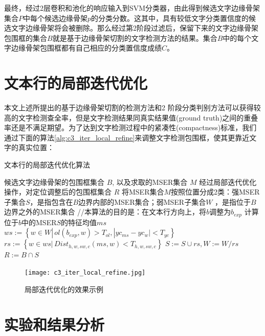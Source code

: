         最终，经过2层卷积和池化的响应输入到SVM分类器，由此得到候选文字边缘骨架集合$P$中每个候选边缘骨架$p$的分类分数。这其中，具有较低文字分类置信度的候选文字边缘骨架将会被删除。那么经过第2阶段过滤后，保留下来的文字边缘骨架包围框的集合$B$就是基于边缘骨架切割的文字检测方法的结果。集合$B$中的每个文字边缘骨架包围框都有自己相应的分类置信度成绩$C$。

    \section{文本行的局部迭代优化}

    本文上述所提出的基于边缘骨架切割的检测方法和2 阶段分类判别方法可以获得较高的文字检测查全率，但是文字检测结果同真实结果值(ground truth)之间的重叠率还是不满足期望。为了达到文字检测过程中的紧凑性(compactness)标准，我们通过下面的算法\ref{alg:c3_iter_local_refine}来调整文字检测包围框，使其更靠近文字的真实位置：

    \begin{algorithm}
	\renewcommand{\algorithmicrequire}{\textbf{输入：}}
	\renewcommand{\algorithmicensure}{\textbf{输出：}}
	\caption{文本行的局部迭代优化算法}
	\label{alg:c3_iter_local_refine}
	\begin{algorithmic}[1]
		\REQUIRE 候选文字边缘骨架的包围框集合 $B$, 以及求取的MSER集合 $M$
		\ENSURE 经过局部迭代优化操作，对定位调整后的包围框集合 $R$
		\STATE 将MSER集合$M$按照位置分成2类：强MSER子集合$S$，是指包含在$B$边界内部的MSER集合；弱MSER子集合$W$ ，是指位于$B$边界之外的MSER集合
        \STATE //本算法的目的是：在文本行方向上，将$b$调整为$b_{exp}$
        \STATE 计算位于$b$中的MSER$S$的特征均值$ms$
		\REPEAT
        \STATE $ws:=\left\{ w \in W |\,ol(b_{exp},w)>T_{ol}, | yc_{ms}-yc_w|<T_{yc} \right\}$
        \STATE $rs:=\left\{ w \in ws |\,Dist_{h,w,sw,c}(ms,w)<T_{h,w,sw,c} \right\}$
        \STATE $S:=S\cup rs,W:=W / rs$
        \STATE $R:=B \cap S$
        \ENDFOR
	\end{algorithmic}
    \end{algorithm}

    \begin{figure}[htbp]
    \centering
    \texttt{[image: c3\_iter\_local\_refine.jpg]}
    \label{fig.c3_iter_local_refine}
    \caption{局部迭代优化的效果示例}
    \end{figure}

    \section{实验和结果分析}

